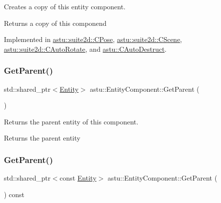 Creates a copy of this entity component.

\begin{DoxyReturn}{Returns}
a copy of this componend 
\end{DoxyReturn}


Implemented in \hyperlink{classastu_1_1suite2d_1_1CPose_a90d4fb820221ddabf9c95d5a10796359}{astu\+::suite2d\+::\+C\+Pose}, \hyperlink{classastu_1_1suite2d_1_1CScene_ae8dad316175ec4bbfbdb7fff3c736cd3}{astu\+::suite2d\+::\+C\+Scene}, \hyperlink{classastu_1_1suite2d_1_1CAutoRotate_af130721018671489c7de3f652ffcc8cf}{astu\+::suite2d\+::\+C\+Auto\+Rotate}, and \hyperlink{classastu_1_1CAutoDestruct_a25a9d187d42fbc3fd16311f74894b345}{astu\+::\+C\+Auto\+Destruct}.

\mbox{\label{classastu_1_1EntityComponent_ae3c2dc735241902588358b933a786603}} 
\subsubsection{\texorpdfstring{Get\+Parent()}{GetParent()}\hspace{0.1cm}{\footnotesize\ttfamily [1/2]}}
{\footnotesize\ttfamily std\+::shared\+\_\+ptr$<$\hyperlink{classastu_1_1Entity}{Entity}$>$ astu\+::\+Entity\+Component\+::\+Get\+Parent (\begin{DoxyParamCaption}{ }\end{DoxyParamCaption})\hspace{0.3cm}{\ttfamily [inline]}}

Returns the parent entity of this component.

\begin{DoxyReturn}{Returns}
the parent entity 
\end{DoxyReturn}
\mbox{\label{classastu_1_1EntityComponent_a33a590990c23ca5bfa8d555b526d7a39}} 
\subsubsection{\texorpdfstring{Get\+Parent()}{GetParent()}\hspace{0.1cm}{\footnotesize\ttfamily [2/2]}}
{\footnotesize\ttfamily std\+::shared\+\_\+ptr$<$const \hyperlink{classastu_1_1Entity}{Entity}$>$ astu\+::\+Entity\+Component\+::\+Get\+Parent (\begin{DoxyParamCaption}{ }\end{DoxyParamCaption}) const\hspace{0.3cm}{\ttfamily [inline]}}

